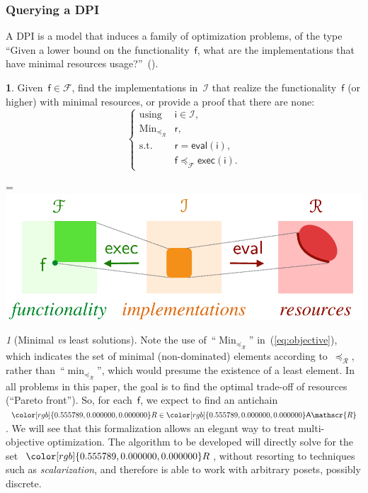 \documentclass[twocolumn,english]{IEEEtran}
\theoremstyle{definition}
\theoremstyle{plain}
\theoremstyle{definition}
\theoremstyle{remark}
\newtheorem{rem}{\protect\remarkname}
\theoremstyle{definition}
\newtheorem{problem}{\protect\problemname}
\theoremstyle{plain}
\theoremstyle{plain}
\newcommand{\aword}[1]{\mathsf{#1}}
\newcommand{\vmath}[1]{\aword{#1}}
\newcommand{\subto}{\text{s.t.}}
\newcommand{\with}{\text{using}}
\DeclareMathOperator*{\Min}{Min}
\newcommand{\posleq}{\preceq}
\newcommand{\antichains}{\vmath{A}}
\newcommand{\funsp}{\mathscr{F}}
\newcommand{\funleq}{\posleq_{\funsp}}
\newcommand{\fun}{\vmath{f}}
\newcommand{\imp}{\vmath{i}}
\newcommand{\impsp}{\mathscr{I}}
\newcommand{\exc}{\vmath{exec}}
\newcommand{\eval}{\vmath{eval}}
\newcommand{\res}{\vmath{r}}
\newcommand{\resleq}{\posleq_{\ressp}}
\newcommand{\ressp}{\mathscr{R}}
\newcommand{\Aressp}{{\antichains\ressp}}
\newcommand{\colR}{\color[rgb]{0.555789,0.000000,0.000000}}
\renewcommand{\resleq}{\posleq_{\ressp}}
\newcommand*{\vcenteredhbox}[1]{\begingroup
\setbox0=\hbox{#1}\parbox{\wd0}{\box0}\endgroup}
\newcommand{\captionsideleft}[2]{
    \medskip
    \begin{minipage}{1.8cm}{
        \hfill
        \protect\captionof{figure}{#1}}\end{minipage}
    \begin{minipage}{6.6cm}
    
    \vcenteredhbox{{#2}}
    \hfill
    \end{minipage}
    \medskip
}
\renewcommand{\Aressp}{{\colR\antichains\ressp}}
\providecommand{\problemname}{Problem}
\providecommand{\remarkname}{Remark}
\begin{document}
\subsubsection{Querying a DPI}

A DPI is a model that induces a family of optimization problems, of
the type ``Given a lower bound on the functionality~$\fun$, what
are the implementations that have minimal resources usage?''~().
\begin{problem}
\label{prob:problem1}Given~$\fun\in\funsp$, find the implementations
in~$\impsp$ that realize the functionality~$\fun$ (or higher)
with minimal resources, or provide a proof that there are none:
\begin{equation}
\begin{cases}
\with & \imp\in\impsp,\\
\Min_{\resleq} & \res,\\
\subto & \res=\eval(\imp),\\
 & \fun\funleq\exc(\imp).
\end{cases}\label{eq:objective}
\end{equation}
\end{problem}
\captionsideleft{\label{fig:setup-1}}{\includegraphics[scale=0.33]{gmcdp_setup_query_f}}


\begin{rem}[Minimal \emph{vs} least solutions]
Note the use of~``$\Min_{\resleq}$'' in~(\ref{eq:objective}),
which indicates the set of minimal (non-dominated) elements according
to~$\resleq$, rather than~``$\min_{\resleq}$'', which would
presume the existence of a least element. In all problems in this
paper, the goal is to find the optimal trade-off of resources (``Pareto
front''). So, for each~$\fun$, we expect to find an antichain~${\colR R}\in\Aressp$.
We will see that this formalization allows an elegant way to treat
multi-objective optimization. The algorithm to be developed will directly
solve for the set~${\colR R}$, without resorting to techniques such
as \emph{scalarization}, and therefore is able to work with arbitrary
posets, possibly discrete.
\end{rem}
\end{document}
